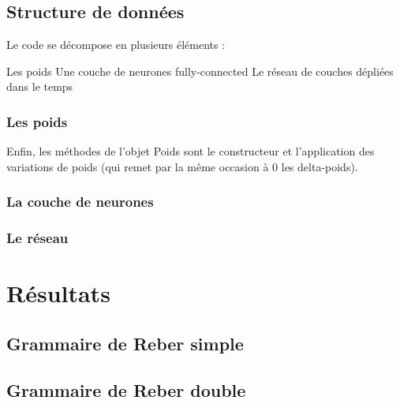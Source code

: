\bigskip

\subsection{Structure de données}

Le code se décompose en plusieurs éléments : 

Les poids
Une couche de neurones fully-connected
Le réseau de couches dépliées dans le temps

\subsubsection{Les poids}


Enfin, les méthodes de l'objet Poids sont le constructeur et
l'application des variations de poids (qui remet par la même occasion à 0
les delta-poids).

\subsubsection{La couche de neurones}


\subsubsection{Le réseau}


\section{Résultats}
\subsection{Grammaire de Reber simple}
\subsection{Grammaire de Reber double}
